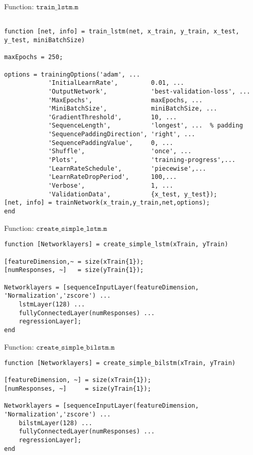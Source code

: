 Function: $\texttt{train\_lstm.m}$
\begin{lstlisting}

function [net, info] = train_lstm(net, x_train, y_train, x_test, y_test, miniBatchSize)

maxEpochs = 250;

options = trainingOptions('adam', ...
            'InitialLearnRate',         0.01, ...
            'OutputNetwork',            'best-validation-loss', ...
            'MaxEpochs',                maxEpochs, ...
            'MiniBatchSize',            miniBatchSize, ...
            'GradientThreshold',        10, ...
            'SequenceLength',           'longest', ...  % padding
            'SequencePaddingDirection', 'right', ...   
            'SequencePaddingValue',     0, ...               
            'Shuffle',                  'once', ...
            'Plots',                    'training-progress',...
            'LearnRateSchedule',        'piecewise',...
            'LearnRateDropPeriod',      100,... 
            'Verbose',                  1, ...
            'ValidationData',           {x_test, y_test});
[net, info] = trainNetwork(x_train,y_train,net,options);
end
\end{lstlisting}

Function: $\texttt{create\_simple\_lstm.m}$
\begin{lstlisting}
function [Networklayers] = create_simple_lstm(xTrain, yTrain)

[featureDimension,~ = size(xTrain{1});
[numResponses, ~]   = size(yTrain{1});

Networklayers = [sequenceInputLayer(featureDimension, 'Normalization','zscore') ...
    lstmLayer(128) ...
    fullyConnectedLayer(numResponses) ...
    regressionLayer];
end
\end{lstlisting}

Function: $\texttt{create\_simple\_bilstm.m}$
\begin{lstlisting}
function [Networklayers] = create_simple_bilstm(xTrain, yTrain)

[featureDimension, ~] = size(xTrain{1});
[numResponses, ~]     = size(yTrain{1});

Networklayers = [sequenceInputLayer(featureDimension, 'Normalization','zscore') ...
    bilstmLayer(128) ...
    fullyConnectedLayer(numResponses) ...
    regressionLayer];
end
\end{lstlisting}

